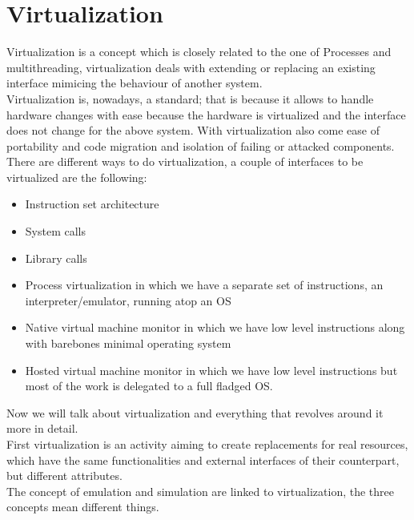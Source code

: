 \section{Virtualization}
Virtualization is a concept which is closely related to the one of Processes and multithreading, virtualization deals with extending or replacing an existing interface mimicing the behaviour of another system. \\
Virtualization is, nowadays, a standard; that is because it allows to handle hardware changes with ease because the hardware is virtualized and the interface does not change for the above system. With virtualization also come ease of portability and code migration and isolation of failing or attacked components. \\
There are different ways to do virtualization, a couple of interfaces to be virtualized are the following:
\begin{itemize}
    \item Instruction set architecture
    \item System calls
    \item Library calls
    \item Process virtualization in which we have a separate set of instructions, an interpreter/emulator, running atop an OS
    \item Native virtual machine monitor in which we have low level instructions along with barebones minimal operating system
    \item Hosted virtual machine monitor in which we have low level instructions but most of the work is delegated to a full fladged OS.
\end{itemize}
Now we will talk about virtualization and everything that revolves around it more in detail. \\
First virtualization is an activity aiming to create replacements for real resources, which have the same functionalities and external interfaces of their counterpart, but different attributes. \\
The concept of emulation and simulation are linked to virtualization, the three concepts mean different things. \\
